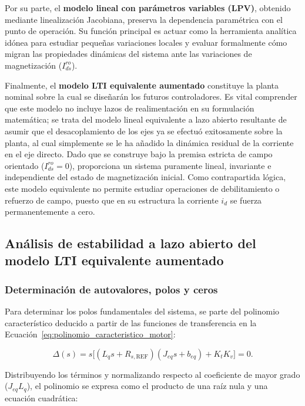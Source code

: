 \documentclass[10pt,a4paper]{article}
\begin{document}
Por su parte, el \textbf{modelo lineal con parámetros variables (LPV)}, obtenido mediante linealización Jacobiana, 
preserva la dependencia paramétrica con el punto de operación. 
Su función principal es actuar como la herramienta analítica idónea para estudiar pequeñas variaciones locales y evaluar formalmente cómo migran las propiedades dinámicas del sistema ante las variaciones de magnetización ($I_{ds}^{ro}$).

Finalmente, el \textbf{modelo LTI equivalente aumentado} constituye la planta nominal sobre la cual se diseñarán los futuros controladores. 
Es vital comprender que este modelo no incluye lazos de realimentación en su formulación matemática; 
se trata del modelo lineal equivalente a lazo abierto resultante de asumir que el desacoplamiento de los ejes ya se efectuó exitosamente sobre la planta, 
al cual simplemente se le ha añadido la dinámica residual de la corriente en el eje directo. 
Dado que se construye bajo la premisa estricta de campo orientado ($I_{ds}^{ro} = 0$), 
proporciona un sistema puramente lineal, invariante e independiente del estado de magnetización inicial. 
Como contrapartida lógica, este modelo equivalente no permite estudiar operaciones de debilitamiento o refuerzo de campo, 
puesto que en su estructura la corriente $i_d$ se fuerza permanentemente a cero.


\subsection{Análisis de estabilidad a lazo abierto del modelo LTI equivalente aumentado}
\subsubsection{Determinación de autovalores, polos y ceros}

Para determinar los polos fundamentales del sistema, se parte del polinomio característico deducido a partir de las funciones de transferencia en la Ecuación~\eqref{eq:polinomio_caracteristico_motor}:

\begin{equation*}
    \Delta(s) = s \Big[ (L_q s + R_{s,\mathrm{REF}})(J_{eq}s + b_{eq}) + K_t K_v \Big] = 0.
\end{equation*}

Distribuyendo los términos y normalizando respecto al coeficiente de mayor grado ($J_{eq}L_q$), el polinomio se expresa como el producto de una raíz nula y una ecuación cuadrática:
\end{document}
